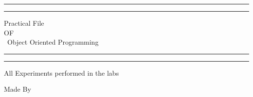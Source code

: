 \documentclass[a4paper, 11pt, oneside]{book} %
\begin{document}
 

\begin{titlepage} %

	\centering %
	
	\scshape %
	
	\vspace*{\baselineskip} %
	
	
	\rule{\textwidth}{1.6pt}\vspace*{-\baselineskip}\vspace*{2pt} %
	\rule{\textwidth}{0.4pt} %
	
	\vspace{0.75\baselineskip} %
	
	{\LARGE Practical File\\ OF\\ \ Object Oriented Programming\\} %
	
	\vspace{0.75\baselineskip} %
	
	\rule{\textwidth}{0.4pt}\vspace*{-\baselineskip}\vspace{3.2pt} %
	\rule{\textwidth}{1.6pt} %
	
	\vspace{2\baselineskip} %
	
	
	All Experiments performed in the labs %
	
	\vspace*{3\baselineskip} %
	
	
	Made By
	
	\vspace{0.5\baselineskip} %
	

\end{titlepage}
\end{document}
